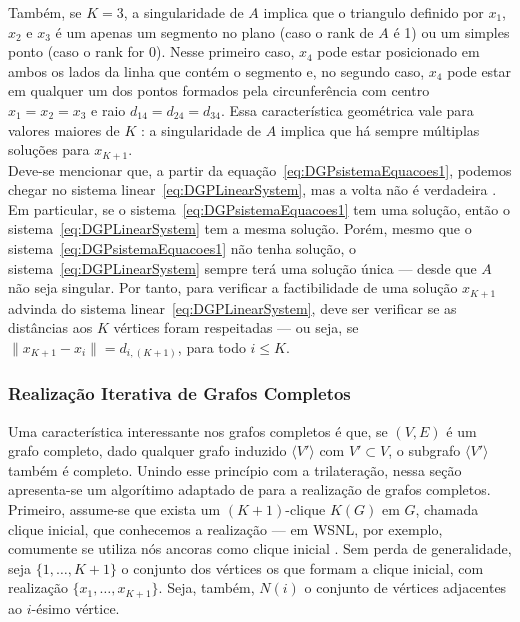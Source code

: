 \documentclass[a4paper,12pt]{article}
\begin{document}
Também, se $K = 3$, a singularidade de $A$ implica que o triangulo definido por $x_1$, $x_2$ e $x_3$ é um apenas um segmento no plano (caso o rank de $A$ é 1) ou um simples ponto (caso o rank for 0). Nesse primeiro caso, $x_4$ pode estar posicionado em ambos os lados da linha que contém o segmento e, no segundo caso, $x_4$ pode estar em qualquer um dos pontos formados pela circunferência com centro $x_1 = x_2 = x_3$ e raio $d_{14} = d_{24} = d_{34}$. Essa característica geométrica vale para valores maiores de $K$ \cite{libertiEDG}: a singularidade de $A$ implica que há sempre múltiplas soluções para $x_{K+1}$.\\

Deve-se mencionar que, a partir da equação~\ref{eq:DGPsistemaEquacoes1}, podemos chegar no sistema linear~\ref{eq:DGPLinearSystem}, mas a volta não é verdadeira \cite{libertiEDG}. Em particular, se o sistema~\ref{eq:DGPsistemaEquacoes1} tem uma solução, então o sistema~\ref{eq:DGPLinearSystem} tem a mesma solução. Porém, mesmo que o sistema~\ref{eq:DGPsistemaEquacoes1} não tenha solução, o sistema~\ref{eq:DGPLinearSystem} sempre terá uma solução única --- desde que $A$ não seja singular. Por tanto, para verificar a factibilidade de uma solução $x_{K+1}$ advinda do sistema linear~\ref{eq:DGPLinearSystem}, deve ser verificar se as distâncias aos $K$ vértices foram respeitadas --- ou seja, se $\lVert x_{K+1} - x_i\rVert = d_{i,(K+1)}$, para todo $i\leq K$. 

\subsubsection{Realização Iterativa de Grafos Completos}

Uma característica interessante nos grafos completos é que, se $(V,E)$ é um grafo completo, dado qualquer grafo induzido $\langle V'\rangle$ com $V'\subset V$, o subgrafo $\langle V' \rangle$ também é completo. Unindo esse princípio com a trilateração, nessa seção apresenta-se um algorítimo adaptado de \cite{libertiEDG} para a realização de grafos completos.\\

Primeiro, assume-se que exista um $(K+1)$-clique $K(G)$ em $G$, chamada clique inicial, que conhecemos a realização --- em WSNL, por exemplo, comumente se utiliza nós ancoras como clique inicial \cite{libertiEDG}. Sem perda de generalidade, seja $\{1,\dots,K+1\}$ o conjunto dos vértices os que formam a clique inicial, com realização $\{x_1, \dots,x_{K+1}\}$. Seja, também, $N(i)$ o conjunto de vértices adjacentes ao $i$-ésimo vértice. 
\\
\end{document}
